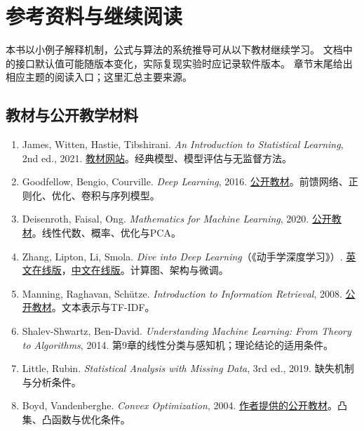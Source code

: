 \chapter*{参考资料与继续阅读}

本书以小例子解释机制，公式与算法的系统推导可从以下教材继续学习。
文档中的接口默认值可能随版本变化，实际复现实验时应记录软件版本。
章节末尾给出相应主题的阅读入口；这里汇总主要来源。

\section*{教材与公开教学材料}
\begin{enumerate}
\item James, Witten, Hastie, Tibshirani. \textit{An Introduction to Statistical Learning}, 2nd ed., 2021.
\href{https://www.statlearning.com/}{教材网站}。经典模型、模型评估与无监督方法。
\item Goodfellow, Bengio, Courville. \textit{Deep Learning}, 2016.
\href{https://www.deeplearningbook.org/}{公开教材}。前馈网络、正则化、优化、卷积与序列模型。
\item Deisenroth, Faisal, Ong. \textit{Mathematics for Machine Learning}, 2020.
\href{https://mml-book.github.io/}{公开教材}。线性代数、概率、优化与PCA。
\item Zhang, Lipton, Li, Smola. \textit{Dive into Deep Learning}（《动手学深度学习》）.
\href{https://d2l.ai/}{英文在线版}，\href{https://zh.d2l.ai/}{中文在线版}。计算图、架构与微调。
\item Manning, Raghavan, Schütze. \textit{Introduction to Information Retrieval}, 2008.
\href{https://nlp.stanford.edu/IR-book/}{公开教材}。文本表示与TF-IDF。
\item Shalev-Shwartz, Ben-David. \textit{Understanding Machine Learning: From Theory to Algorithms}, 2014.
第9章的线性分类与感知机；理论结论的适用条件。
\item Little, Rubin. \textit{Statistical Analysis with Missing Data}, 3rd ed., 2019. 缺失机制与分析条件。
\item Boyd, Vandenberghe. \textit{Convex Optimization}, 2004.
\href{https://web.stanford.edu/~boyd/cvxbook/}{作者提供的公开教材}。凸集、凸函数与优化条件。
\end{enumerate}


